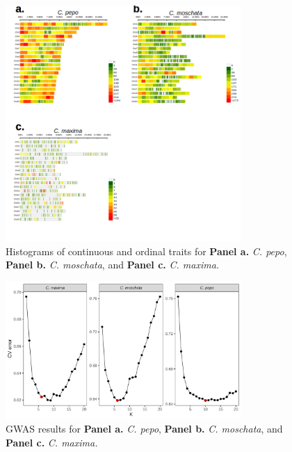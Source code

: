 \documentclass[utf8]{frontiers_suppmat} %
\begin{document}
\begin{figure}[h]
\begin{center}
\includegraphics[width=0.8\textwidth]{../supplemental/01_supfig}%
\end{center}
\caption{Histograms of continuous and ordinal traits for \textbf{Panel a.} \textit{C. pepo}, \textbf{Panel b.} \textit{C. moschata}, and \textbf{Panel c.} \textit{C. maxima.}\label{fig:1}}
\end{figure}

\clearpage

\begin{figure}[h]
	\begin{center}
		\includegraphics[width=0.8\textwidth]{../supplemental/02_supfig}%
	\end{center}
	\caption{GWAS results for \textbf{Panel a.} \textit{C. pepo}, \textbf{Panel b.} \textit{C. moschata}, and \textbf{Panel c.} \textit{C. maxima.}\label{fig:2}}
\end{figure}
\end{document}
